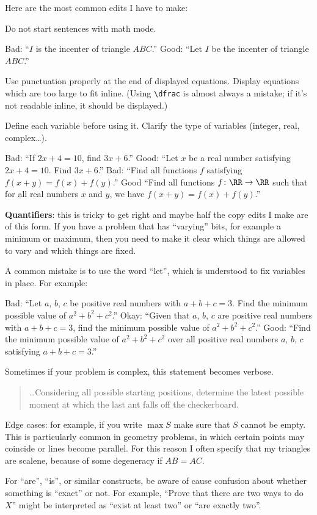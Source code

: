 \documentclass[11pt]{scrartcl}
\theoremstyle{inlined}
\begin{document}
Here are the most common edits I have to make:
\begin{itemize}
   \ii Do not start sentences with math mode.
   \begin{itemize}
      \ii Bad: ``$I$ is the incenter of triangle $ABC$.''
      \ii Good: ``Let $I$ be the incenter of triangle $ABC$.''
   \end{itemize}

   \ii Use punctuation properly at the end of displayed equations.
   Display equations which are too large to fit inline.
   (Using \verb+\dfrac+ is almost always a mistake;
   if it's not readable inline, it should be displayed.)

   \ii Define each variable before using it.
   Clarify the type of variables (integer, real, complex\dots).
   \begin{itemize}
      \ii Bad: ``If $2x+4 = 10$, find $3x+6$.''
      \ii Good: ``Let $x$ be a real number satisfying $2x+4=10$. Find $3x+6$.''
      \ii Bad: ``Find all functions $f$ satisfying $f(x+y)=f(x)+f(y)$.''
      \ii Good ``Find all functions $f \colon \RR \to \RR$
      such that for all real numbers $x$ and $y$,
      we have $f(x+y)=f(x)+f(y)$.''
   \end{itemize}

   \ii \textbf{Quantifiers}: this is tricky to get right
   and maybe half the copy edits I make are of this form.
   If you have a problem that has ``varying'' bits,
   for example a minimum or maximum, then you need to make it clear
   which things are allowed to vary and which things are fixed.

   A common mistake is to use the word ``let'',
   which is understood to fix variables in place.
   For example:
   \begin{itemize}
      \ii Bad: ``Let $a$, $b$, $c$ be positive real numbers with $a+b+c=3$.
      Find the minimum possible value of $a^2+b^2+c^2$.''
      \ii Okay: ``Given that $a$, $b$, $c$ are positive real numbers with $a+b+c=3$,
      find the minimum possible value of $a^2+b^2+c^2$.''
      \ii Good: ``Find the minimum possible value of $a^2+b^2+c^2$
      over all positive real numbers $a$, $b$, $c$ satisfying $a+b+c=3$.''
   \end{itemize}
   Sometimes if your problem is complex, this statement becomes verbose.
   \begin{quote}
      \dots Considering all possible starting positions,
      determine the latest possible moment at which the last ant falls off the checkerboard.
   \end{quote}

   \ii Edge cases:
   for example, if you write $\max S$ make sure that $S$ cannot be empty.
   This is particularly common in geometry problems,
   in which certain points may coincide or lines become parallel.
   For this reason I often specify that my triangles are scalene,
   because of some degeneracy if $AB=AC$.

   \ii For ``are'', ``is'', or similar constructs,
   be aware of cause confusion about whether something is ``exact'' or not.
   For example, ``Prove that there are two ways to do $X$''
   might be interpreted as ``exist at least two''
   or ``are exactly two''.
\end{itemize}
\end{document}
